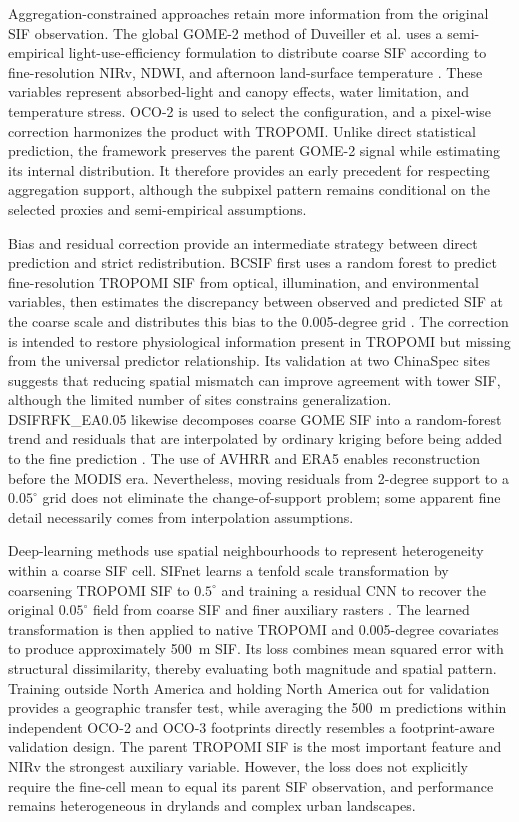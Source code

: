 Aggregation-constrained approaches retain more information from the original SIF observation. The global GOME-2 method of Duveiller et al. uses a semi-empirical light-use-efficiency formulation to distribute coarse SIF according to fine-resolution NIRv, NDWI, and afternoon land-surface temperature \cite{duveiller2020spatially}. These variables represent absorbed-light and canopy effects, water limitation, and temperature stress. OCO-2 is used to select the configuration, and a pixel-wise correction harmonizes the product with TROPOMI. Unlike direct statistical prediction, the framework preserves the parent GOME-2 signal while estimating its internal distribution. It therefore provides an early precedent for respecting aggregation support, although the subpixel pattern remains conditional on the selected proxies and semi-empirical assumptions.

Bias and residual correction provide an intermediate strategy between direct prediction and strict redistribution. BCSIF first uses a random forest to predict fine-resolution TROPOMI SIF from optical, illumination, and environmental variables, then estimates the discrepancy between observed and predicted SIF at the coarse scale and distributes this bias to the 0.005-degree grid \cite{hu2024spatially}. The correction is intended to restore physiological information present in TROPOMI but missing from the universal predictor relationship. Its validation at two ChinaSpec sites suggests that reducing spatial mismatch can improve agreement with tower SIF, although the limited number of sites constrains generalization. DSIFRFK\_EA0.05 likewise decomposes coarse GOME SIF into a random-forest trend and residuals that are interpolated by ordinary kriging before being added to the fine prediction \cite{jin2024downscaling}. The use of AVHRR and ERA5 enables reconstruction before the MODIS era. Nevertheless, moving residuals from 2-degree support to a $0.05^{\circ}$ grid does not eliminate the change-of-support problem; some apparent fine detail necessarily comes from interpolation assumptions.

Deep-learning methods use spatial neighbourhoods to represent heterogeneity within a coarse SIF cell. SIFnet learns a tenfold scale transformation by coarsening TROPOMI SIF to $0.5^{\circ}$ and training a residual CNN to recover the original $0.05^{\circ}$ field from coarse SIF and finer auxiliary rasters \cite{gensheimer2022convolutional}. The learned transformation is then applied to native TROPOMI and 0.005-degree covariates to produce approximately 500~m SIF. Its loss combines mean squared error with structural dissimilarity, thereby evaluating both magnitude and spatial pattern. Training outside North America and holding North America out for validation provides a geographic transfer test, while averaging the 500~m predictions within independent OCO-2 and OCO-3 footprints directly resembles a footprint-aware validation design. The parent TROPOMI SIF is the most important feature and NIRv the strongest auxiliary variable. However, the loss does not explicitly require the fine-cell mean to equal its parent SIF observation, and performance remains heterogeneous in drylands and complex urban landscapes.

